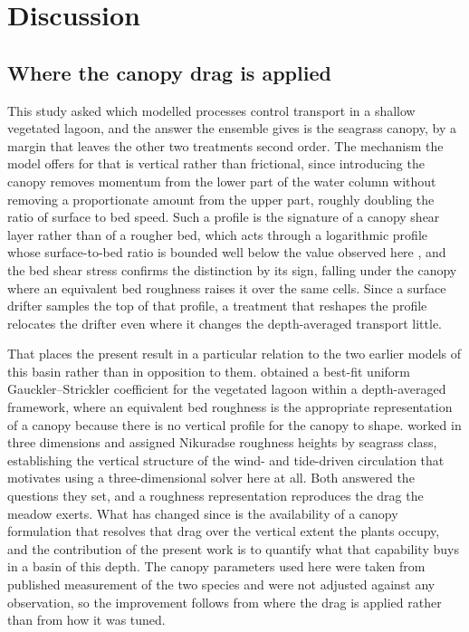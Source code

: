 \section{Discussion}
\label{sec:discussion}

\subsection{Where the canopy drag is applied}

This study asked which modelled processes control transport in a shallow
vegetated lagoon, and the answer the ensemble gives is the seagrass canopy, by a
margin that leaves the other two treatments second order. The mechanism the
model offers for that is vertical rather than frictional, since introducing the
canopy removes momentum from the lower part of the water column without removing
a proportionate amount from the upper part, roughly doubling the ratio of
surface to bed speed. Such a profile is the signature of a canopy shear layer
rather than of a rougher bed, which acts through a logarithmic profile whose
surface-to-bed ratio is bounded well below the value observed here
\citep{Nepf2012}, and the bed shear stress confirms the distinction by its sign,
falling under the canopy where an equivalent bed roughness raises it over the
same cells. Since a surface drifter samples the top of that profile, a treatment
that reshapes the profile relocates the drifter even where it changes the
depth-averaged transport little.

That places the present result in a particular relation to the two earlier
models of this basin rather than in opposition to them.
\citet{Ingrassia2024} obtained a best-fit uniform Gauckler--Strickler
coefficient for the vegetated lagoon within a depth-averaged framework, where an
equivalent bed roughness is the appropriate representation of a canopy because
there is no vertical profile for the canopy to shape. \citet{DeMarchis2012}
worked in three dimensions and assigned Nikuradse roughness heights by seagrass
class, establishing the vertical structure of the wind- and tide-driven
circulation that motivates using a three-dimensional solver here at all. Both
answered the questions they set, and a roughness representation reproduces the
drag the meadow exerts. What has changed since is the availability of a
canopy formulation that resolves that drag over the vertical extent the plants
occupy, and the contribution of the present work is to quantify what that
capability buys in a basin of this depth. The canopy parameters used here were
taken from published measurement of the two species and were not adjusted
against any observation, so the improvement follows from where the drag is
applied rather than from how it was tuned.

